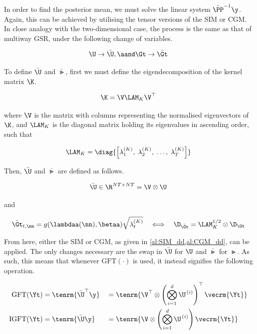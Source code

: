 In order to find the posterior mean, we must solve the linear system $\bar{\PP}^{-1} \y$. Again, this can be achieved by utilising the tensor versions of the SIM or CGM. In close analogy with the two-dimensional case, the process is the same as that of multiway GSR, under the following change of variables. 

\begin{equation}
    \U \rightarrow \bar{\U}, \aand \Gt \rightarrow \bar{\Gt}
\end{equation}

To define $\bar{\U}$ and $\bar{\Gt}$, first we must define the eigendecomposition of the kernel matrix $\K$. 

\begin{equation}
    \K = \V \LAM_K \V^\top
\end{equation}

where $\V$ is the matrix with columns representing the normalised eigenvectors of $\K$, and $\LAM_K$ is the diagonal matrix holding its eigenvalues in ascending order, such that  

\begin{equation}
\LAM_K = \diag{\left[\lambda^{(K)}_1, \; \lambda^{(K)}_2, \; \dots, \;\lambda^{(K)}_T \right]}
\end{equation}

Then, $\bar{\U}$ and $\bar{\Gt}$ are defined as follows.

\begin{equation}
    \bar{\U} \in \R^{NT \times NT} = \V \otimes \U
\end{equation}

and 

\begin{equation}
    \bar{\Gt}_{t, \nn} = g(\lambdaa(\nn), \betaa) \sqrt{\lambda_t^{(K)}} \quad \Longleftrightarrow \quad \D_{\bar{\Gt}} = \LAM_K^{1/2} \otimes \D_\Gt 
\end{equation}

From here, either the SIM or CGM, as given in \cref{al:SIM_dd,al:CGM_dd}, can be applied. The only changes necessary are the swap in $\bar{\U}$ for $\U$ and $\bar{\Gt}$ for $\Gt$. As such, this means that whenever $\text{GFT}(\cdot)$ is used, it instead signifies the following operation.  

\begin{alignat}{2}
    \label{eq:gftp_nd}
        \text{GFT}(\Yt) & = \tenrm{\bar{\U}^\top \y} && = \tenrm{\V^\top \otimes \left(  \bigotimes_{i=1}^d  \U^{\,(i)} \right)^\top \vecrm{\Yt} } \\
    \label{eq:igftp_nd}
        \text{IGFT}(\Yt) & = \tenrm{\bar{\U} \y} && = \tenrm{\V \otimes \left(  \bigotimes_{i=1}^d  \U^{\,(i)} \right) \vecrm{\Yt} }
\end{alignat}

